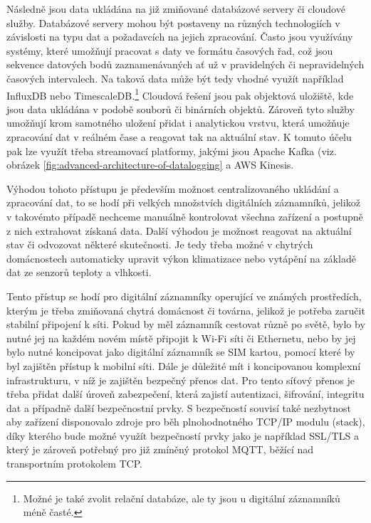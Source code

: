
Následně jsou data ukládána na již zmiňované databázové servery či cloudové služby. Databázové servery mohou být postaveny na různých technologiích v závislosti na typu dat a požadavcích na jejich zpracování. Často jsou využívány systémy, které umožňují pracovat s daty ve formátu časových řad, což jsou sekvence datových bodů zaznamenávaných ať už v pravidelných či nepravidelných časových intervalech. Na taková data může být tedy vhodné využít například InfluxDB nebo TimescaleDB.\footnote{Možné je také zvolit relační databáze, ale ty jsou u digitální záznamníků méně časté.} Cloudová řešení jsou pak objektová uložiště, kde jsou data ukládána v podobě souborů či binárních objektů. Zároveň tyto služby umožňují krom samotného uložení přidat i analytickou vrstvu, která umožňuje zpracování dat v reálném čase a reagovat tak na aktuální stav. K tomuto účelu pak lze využít třeba streamovací platformy, jakými jsou Apache Kafka (viz. obrázek \ref{fig:advanced-architecture-of-datalogging} a AWS Kinesis. \cite{springer_analysis_time_series_db_edge_computing}

Výhodou tohoto přístupu je především možnost centralizovaného ukládání a zpracování dat, to se hodí při velkých množstvích digitálních záznamníků, jelikož v takovémto případě nechceme manuálně kontrolovat všechna zařízení a postupně z nich extrahovat získaná data. Další výhodou je možnost reagovat na aktuální stav či odvozovat některé skutečnosti. Je tedy třeba možné v chytrých domácnostech automaticky upravit výkon klimatizace nebo vytápění na základě dat ze senzorů teploty a vlhkosti. \cite{springer_analysis_time_series_db_edge_computing}

Tento přístup se hodí pro digitální záznamníky operující ve známých prostředích, kterým je třeba zmiňovaná chytrá domácnost či továrna, jelikož je potřeba zaručit stabilní připojení k síti. Pokud by měl záznamník cestovat různě po světě, bylo by nutné jej na každém novém místě připojit k Wi-Fi síti či Ethernetu, nebo by jej bylo nutné koncipovat jako digitální záznamník se SIM kartou, pomocí které by byl zajištěn přístup k mobilní síti. Dále je důležité mít i koncipovanou komplexní infrastrukturu, v níž je zajištěn bezpečný přenos dat. Pro tento síťový přenos je třeba přidat další úroveň zabezpečení, která zajistí autentizaci, šifrování, integritu dat a případně další bezpečnostní prvky. S bezpečností souvisí také nezbytnost aby zařízení disponovalo zdroje pro běh plnohodnotného TCP/IP modulu
(stack), díky kterého bude možné využít bezpečností prvky jako je například SSL/TLS a který je zároveň potřebný pro již zmíněný protokol MQTT, běžící nad transportním protokolem TCP.


